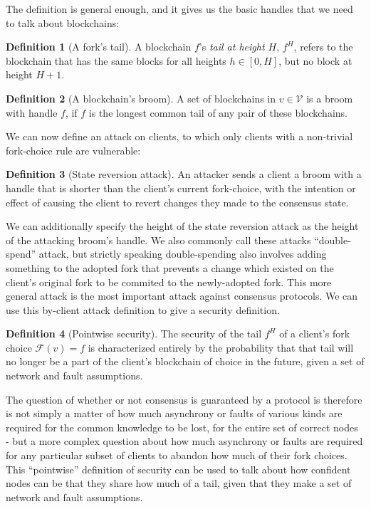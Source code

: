 \documentclass[11pt,a4paper]{article}
\theoremstyle{plain}
\theoremstyle{definition}
\newtheorem{defn}{Definition}
\begin{document}
The definition is general enough, and it gives us the basic handles that we need to talk about blockchains:

\begin{defn}[A fork's tail]
A blockchain $f$'s \emph{tail at height $H$}, $f^H$, refers to the blockchain that has the same blocks for all heights $h \in [0,H]$, but no block at height $H + 1$.
\end{defn}

\begin{defn}[A blockchain's broom]
A set of blockchains in $v \in \mathcal{V}$ is a broom with handle $f$, if $f$ is the longest common tail of any pair of these blockchains.
\end{defn}

We can now define an attack on clients, to which only clients with a non-trivial fork-choice rule are vulnerable:

\begin{defn}[State reversion attack]
An attacker sends a client a broom with a handle that is shorter than the client's current fork-choice, with the intention or effect of causing the client to revert changes they made to the consensus state.
\end{defn}

We can additionally specify the height of the state reversion attack as the height of the attacking broom's handle. We also commonly call these attacks ``double-spend'' attack, but strictly speaking double-spending also involves adding something to the adopted fork that prevents a change which existed on the client's original fork to be commited to the newly-adopted fork. This more general attack is the most important attack against consensus protocols. We can use this by-client attack definition to give a security definition.

\begin{defn}[Pointwise security]
The security of the tail $f^H$ of a client's fork choice $\mathcal{F}(v) = f$ is characterized entirely by the probability that that tail will no longer be a part of the client's blockchain of choice in the future, given a set of network and fault assumptions. 
\end{defn}

The question of whether or not consensus is guaranteed by a protocol is therefore is not simply a matter of how much asynchrony or faults of various kinds are required for the common knowledge to be lost, for the entire set of correct nodes - but a more complex question about how much asynchrony or faults are required for any particular subset of clients to abandon how much of their fork choices. This ``pointwise'' definition of security can be used to talk about how confident nodes can be that they share how much of a tail, given that they make a set of network and fault assumptions. 
\end{document}
